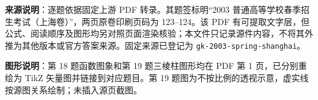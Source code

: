 


\begin{gktip}
\textbf{来源说明}：逐题依据固定上游 PDF 转录。其题签标明“2003 普通高等学校春季招生考试（上海卷）”，两页原卷印刷页码为 123–124。该 PDF 有可提取文字层，但公式、阅读顺序及图形均另对照页面渲染核验；本文件只记录源件内容，不将其外推为其他版本或官方答案来源。固定来源已登记为 \texttt{gk-2003-spring-shanghai}。

\textbf{图形说明}：第 18 题函数图象和第 19 题三棱柱图形均在 PDF 第 1 页，已分别重绘为 TikZ 矢量图并链接到对应题目。第 19 题图为不按比例的透视示意，虚实线按源图关系绘制；未插入源页截图。
\end{gktip}


